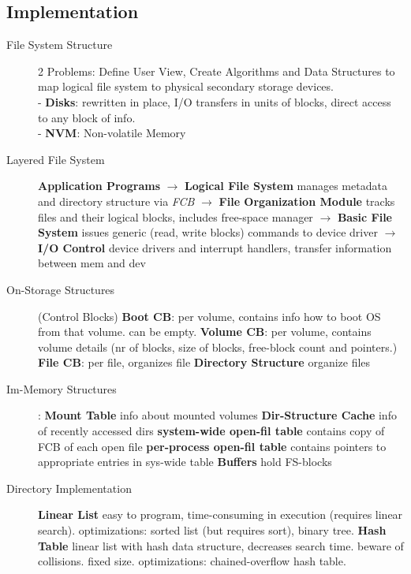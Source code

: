 \subsection*{Implementation}
\begin{description}
    \item[File System Structure]2 Problems: Define User View, Create Algorithms and Data Structures to map logical file system to physical secondary storage devices.\\
        - \textbf{Disks}: rewritten in place, I/O transfers in units of blocks, direct access to any block of info. \\
        - \textbf{NVM}: Non-volatile Memory \\
    \item[Layered File System]\textbf{Application Programs} $\rightarrow$ \textbf{Logical File System} manages metadata and directory structure via \textit{FCB} $\rightarrow$ \textbf{File Organization Module} tracks files and their logical blocks, includes free-space manager $\rightarrow$ \textbf{Basic File System} issues generic (read, write blocks) commands to device driver $\rightarrow$ \textbf{I/O Control} device drivers and interrupt handlers, transfer information between mem and dev
    \item[On-Storage Structures] (Control Blocks) \textbf{Boot CB}: per volume, contains info how to boot OS from that volume. can be empty. \textbf{Volume CB}: per volume, contains volume details (nr of blocks, size of blocks, free-block count and pointers.) \textbf{File CB}: per file, organizes file \textbf{Directory Structure} organize files  %
    \item[Im-Memory Structures]: \textbf{Mount Table} info about mounted volumes \textbf{Dir-Structure Cache} info of recently accessed dirs \textbf{system-wide open-fil table} contains copy of FCB of each open file \textbf{per-process open-fil table} contains pointers to appropriate entries in sys-wide table \textbf{Buffers} hold FS-blocks %
    \item[Directory Implementation] \textbf{Linear List} easy to program, time-consuming in execution (requires linear search). optimizations: sorted list (but requires sort), binary tree. \textbf{Hash Table} linear list with hash data structure, decreases search time. beware of collisions. fixed size. optimizations: chained-overflow hash table.

\end{description}
